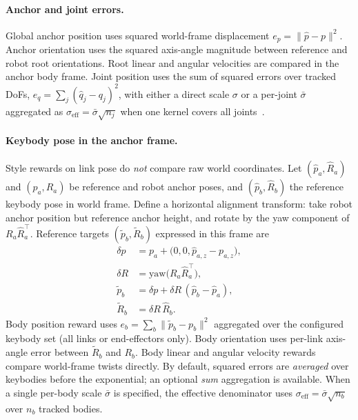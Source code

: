\documentclass[11pt,a4paper]{article}
\begin{document}
\paragraph{Anchor and joint errors.}
Global anchor position uses squared world-frame displacement
$e_p=\|\hat p - p\|^2$. Anchor orientation uses the squared axis-angle magnitude
between reference and robot root orientations. Root linear and angular velocities
are compared in the anchor body frame. Joint position uses the sum of squared
errors over tracked DoFs,
$e_q=\sum_j (\hat q_j - q_j)^2$, with either a direct scale $\sigma$ or a
per-joint $\bar\sigma$ aggregated as $\sigma_{\mathrm{eff}}=\bar\sigma\sqrt{n_j}$
when one kernel covers all joints~\citep{zest2026}.

\paragraph{Keybody pose in the anchor frame.}
Style rewards on link pose do \emph{not} compare raw world coordinates. Let
$(\hat p_a,\hat R_a)$ and $(p_a,R_a)$ be reference and robot anchor poses, and
$(\hat p_b,\hat R_b)$ the reference keybody pose in world frame. Define a
horizontal alignment transform: take robot anchor position but reference anchor
height, and rotate by the yaw component of $R_a \hat R_a^{\top}$. Reference
targets $(\tilde p_b,\tilde R_b)$ expressed in this frame are
\begin{align}
  \delta p &= p_a + \bigl(0,0,\hat p_{a,z}-p_{a,z}\bigr), \\
  \delta R &= \mathrm{yaw}\bigl(R_a \hat R_a^{\top}\bigr), \\
  \tilde p_b &= \delta p + \delta R\,(\hat p_b - \hat p_a), \\
  \tilde R_b &= \delta R\,\hat R_b .
\end{align}
Body position reward uses $e_b=\sum_b \|\tilde p_b - p_b\|^2$ aggregated over
the configured keybody set (all links or end-effectors only). Body orientation
uses per-link axis-angle error between $\tilde R_b$ and $R_b$. Body linear and
angular velocity rewards compare world-frame twists directly. By default, squared
errors are \emph{averaged} over keybodies before the exponential; an optional
\emph{sum} aggregation is available. When a single per-body scale $\bar\sigma$ is
specified, the effective denominator uses
$\sigma_{\mathrm{eff}}=\bar\sigma\sqrt{n_b}$ over $n_b$ tracked bodies.
\end{document}
